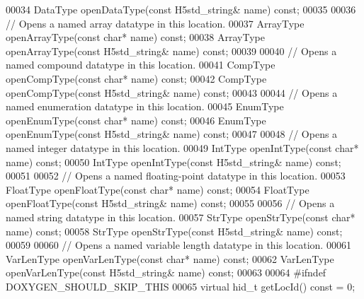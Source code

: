 \begin{DoxyCode}
00034         DataType openDataType(\textcolor{keyword}{const} H5std\_string& name) \textcolor{keyword}{const};
00035 
00036         \textcolor{comment}{// Opens a named array datatype in this location.}
00037         ArrayType openArrayType(\textcolor{keyword}{const} \textcolor{keywordtype}{char}* name) \textcolor{keyword}{const};
00038         ArrayType openArrayType(\textcolor{keyword}{const} H5std\_string& name) \textcolor{keyword}{const};
00039 
00040         \textcolor{comment}{// Opens a named compound datatype in this location.}
00041         CompType openCompType(\textcolor{keyword}{const} \textcolor{keywordtype}{char}* name) \textcolor{keyword}{const};
00042         CompType openCompType(\textcolor{keyword}{const} H5std\_string& name) \textcolor{keyword}{const};
00043 
00044         \textcolor{comment}{// Opens a named enumeration datatype in this location.}
00045         EnumType openEnumType(\textcolor{keyword}{const} \textcolor{keywordtype}{char}* name) \textcolor{keyword}{const};
00046         EnumType openEnumType(\textcolor{keyword}{const} H5std\_string& name) \textcolor{keyword}{const};
00047 
00048         \textcolor{comment}{// Opens a named integer datatype in this location.}
00049         IntType openIntType(\textcolor{keyword}{const} \textcolor{keywordtype}{char}* name) \textcolor{keyword}{const};
00050         IntType openIntType(\textcolor{keyword}{const} H5std\_string& name) \textcolor{keyword}{const};
00051 
00052         \textcolor{comment}{// Opens a named floating-point datatype in this location.}
00053         FloatType openFloatType(\textcolor{keyword}{const} \textcolor{keywordtype}{char}* name) \textcolor{keyword}{const};
00054         FloatType openFloatType(\textcolor{keyword}{const} H5std\_string& name) \textcolor{keyword}{const};
00055 
00056         \textcolor{comment}{// Opens a named string datatype in this location.}
00057         StrType openStrType(\textcolor{keyword}{const} \textcolor{keywordtype}{char}* name) \textcolor{keyword}{const};
00058         StrType openStrType(\textcolor{keyword}{const} H5std\_string& name) \textcolor{keyword}{const};
00059 
00060         \textcolor{comment}{// Opens a named variable length datatype in this location.}
00061         VarLenType openVarLenType(\textcolor{keyword}{const} \textcolor{keywordtype}{char}* name) \textcolor{keyword}{const};
00062         VarLenType openVarLenType(\textcolor{keyword}{const} H5std\_string& name) \textcolor{keyword}{const};
00063 
00064 \textcolor{preprocessor}{#ifndef DOXYGEN\_SHOULD\_SKIP\_THIS}
00065         \textcolor{keyword}{virtual} hid\_t getLocId() \textcolor{keyword}{const} = 0;

\end{DoxyCode}
